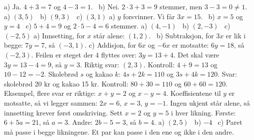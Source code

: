 
 a) Ja. $4 + 3 = 7$ og $4 - 3 = 1$. \ b) Nei. $2 \cdot 3 + 3 = 9$ stemmer, men $3 - 3 = 0 \neq 1$.
 a) $(3, 5)$ \ b) $(9, 3)$ \ c) $(3, 1)$
 a) $y$ forsvinner. Vi får $3x = 15$. \ b) $x = 5$ og $y = 4$ \ c) $5 + 4 = 9$ og $2 \cdot 5 - 4 = 6$ stemmer.
 a) $(4, -1)$ \ b) $(2, -3)$ \ c) $(-2, 5)$
 a) Innsetting, for $x$ står alene: $(1, 2)$. \ b) Subtraksjon, for $3x$ er lik i begge: $7y = 7$, så $(-3, 1)$.
c) Addisjon, for $6x$ og $-6x$ er motsatte: $6y = 18$, så $(-2, 3)$.
 Feilen er steget der $4$ flyttes over: $3y = 13 + 4$. Det skal være $3y = 13 - 4 = 9$, så $y = 3$. Riktig svar: $(2, 3)$. Kontroll: $4 + 9 = 13$ og $10 - 12 = -2$.
 Skolebrød $s$ og kakao $k$: $4s + 2k = 110$ og $3s + 4k = 120$. Svar: skolebrød 20 kr og kakao 15 kr. Kontroll: $80 + 30 = 110$ og $60 + 60 = 120$.
 Eksempel, flere svar er riktige: $x + y = 2$ og $x - y = 4$. Koeffisientene til $y$ er motsatte, så vi legger sammen: $2x = 6$, $x = 3$, $y = -1$.
Ingen ukjent står alene, så innsetting krever først omskriving.
 Sett $x = 2$ og $y = 5$ i hver likning. Første: $6 + 5a = 21$, så $a = 3$. Andre: $2b - 5 = 3$, så $b = 4$.
 a) $(2, 5)$ \ b) $-4$ \ c) Paret må passe i begge likningene. Et par kan passe i den ene og ikke i den andre.

